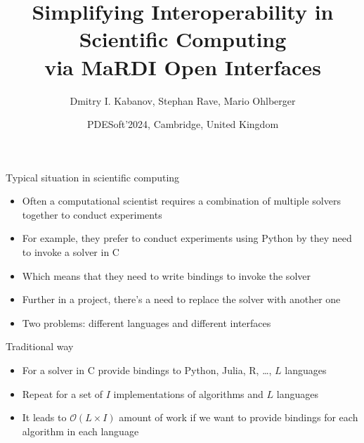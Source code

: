 \documentclass[10pt, aspectratio=169, progressbar=frametitle]{beamer}
\title{Simplifying Interoperability in Scientific Computing\\via MaRDI Open Interfaces}
\author{Dmitry I. Kabanov, Stephan Rave, Mario Ohlberger}
\institute{Institute for Analysis and Numerics, University of Münster}
\date{{\large PDESoft'2024, Cambridge, United Kingdom}}
\begin{document}
\maketitle

\begin{frame}{Typical situation in scientific computing}
  \begin{itemize}
    \item Often a computational scientist requires
          a combination of multiple solvers together to conduct experiments
    \item For example, they prefer to conduct experiments using Python
          by they need to invoke a solver in C
    \item Which means that they need to write bindings to invoke the solver
    \item Further in a project, there's a need to replace the solver with
          another one
    \item \alert{Two problems:} different languages and different interfaces
  \end{itemize}
\end{frame}

\begin{frame}{Traditional way}
  \begin{minipage}{0.45\textwidth}
    \begin{itemize}
      \item For a solver in C provide bindings to Python, Julia, R, \dots, $L$ languages
      \item Repeat for a set of $I$ implementations of algorithms and $L$ languages
      \item It leads to $\mathcal O(L \times I)$ amount of work if we want to provide
            bindings for each algorithm in each language
    \end{itemize}
  \end{minipage}\hfill
  \begin{minipage}{0.45\textwidth}
    
  \end{minipage}
\end{frame}
\end{document}
